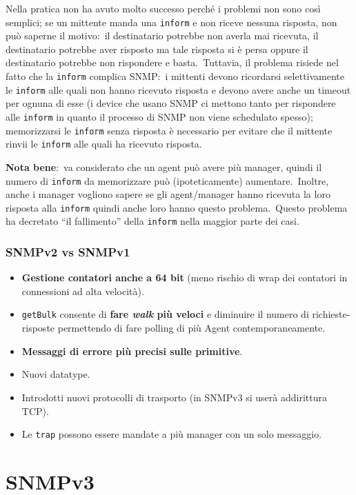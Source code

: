 Nella pratica non ha avuto molto successo perché i problemi non sono così semplici; se un mittente manda una \texttt{inform} e non riceve nessuna risposta, non può saperne il motivo:\ il destinatario potrebbe non averla mai ricevuta, il destinatario potrebbe aver risposto ma tale risposta si è persa oppure il destinatario potrebbe non rispondere e basta.\
Tuttavia, il problema risiede nel fatto che la \texttt{inform} complica SNMP:\ i mittenti devono ricordarsi selettivamente le \texttt{inform} alle quali non hanno ricevuto risposta e devono avere anche un timeout per ognuna di esse (i device che usano SNMP ci mettono tanto per rispondere alle \texttt{inform} in quanto il processo di SNMP non viene schedulato spesso); memorizzarsi le \texttt{inform} senza risposta è necessario per evitare che il mittente rinvii le \texttt{inform} alle quali ha ricevuto risposta.\

\textbf{Nota bene}:\ va considerato che un agent può avere più manager, quindi il numero di \texttt{inform} da memorizzare può (ipoteticamente) aumentare.\
Inoltre, anche i manager vogliono sapere se gli agent/manager hanno ricevuta la loro risposta alla \texttt{inform} quindi anche loro hanno questo problema.\
Questo problema ha decretato ``il fallimento'' della \texttt{inform} nella maggior parte dei casi.

\subsubsection{SNMPv2 vs SNMPv1}

\begin{itemize}
    \item \textbf{Gestione contatori anche a 64 bit} (meno rischio di wrap dei contatori in connessioni ad alta velocità).
    \item \texttt{getBulk} consente di \textbf{fare \textit{walk} più veloci} e diminuire il numero di richieste-risposte permettendo di fare polling di più Agent contemporaneamente.
    \item \textbf{Messaggi di errore più precisi sulle primitive}.
    \item Nuovi datatype.
    \item Introdotti nuovi protocolli di trasporto (in SNMPv3 si userà addirittura TCP).
    \item Le \texttt{trap} possono essere mandate a più manager con un solo messaggio.
\end{itemize}

\section{SNMPv3}

